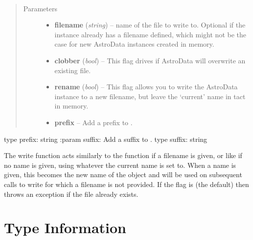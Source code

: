 \documentclass[letterpaper,10pt,english]{sphinxmanual}
\begin{document}
\begin{fulllineitems}
\label{chapter_AstroDataClass:astrodata.data.AstroData.write}~\begin{quote}\begin{description}
\item[{Parameters}] \leavevmode\begin{itemize}
\item {} 
\textbf{filename} (\emph{string}) -- name of the file to write to. Optional if the instance
already has a filename defined, which might not be the case for new AstroData
instances created in memory.

\item {} 
\textbf{clobber} (\emph{bool}) -- This flag drives if AstroData will overwrite an existing
file.

\item {} 
\textbf{rename} (\emph{bool}) -- This flag allows you to write the AstroData instance to
a new filename, but leave the `current' name in tact in memory.

\item {} 
\textbf{prefix} -- Add a prefix to .

\end{itemize}

\end{description}\end{quote}

type prefix: string
:param suffix: Add a suffix to .
type suffix: string

The write function acts similarly to the 
function if a filename is given, or like  if 
no name is given, using whatever the current name is set to. When a name
is given, this becomes the new name of the  object and
will be used on subsequent calls to  write for which a filename is not
provided. If the  flag is  (the default) then 
throws an exception if the file already exists.

\end{fulllineitems}



\section{Type Information}
\label{chapter_AstroDataClass:type-information}
\end{document}
